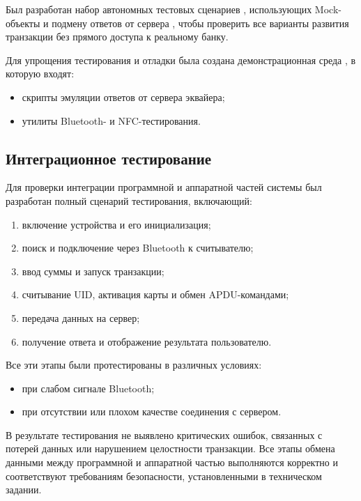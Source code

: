 Был разработан набор автономных тестовых сценариев , использующих Mock-объекты и подмену ответов от сервера , чтобы проверить все варианты развития транзакции без прямого доступа к реальному банку.


Для упрощения тестирования и отладки была создана демонстрационная среда , в которую входят:

\begin{itemize}
	\item скрипты эмуляции ответов от сервера эквайера;
	\item утилиты Bluetooth- и NFC-тестирования.
\end{itemize}

\subsection{Интеграционное тестирование}
\label{subsec:test_integr}
Для проверки интеграции программной и аппаратной частей системы был разработан полный сценарий тестирования, включающий:

\begin{enumerate}
	\item включение устройства и его инициализация;
	\item поиск и подключение через Bluetooth к считывателю;
	\item ввод суммы и запуск транзакции;
	\item считывание UID, активация карты и обмен APDU-командами;
	\item передача данных на сервер;
	\item получение ответа и отображение результата пользователю.
\end{enumerate}

Все эти этапы были протестированы в различных условиях:

\begin{itemize}
	\item при слабом сигнале Bluetooth;
	\item при отсутствии или плохом качестве соединения с сервером.
\end{itemize}

В результате тестирования не выявлено критических ошибок, связанных с потерей данных или нарушением целостности транзакции.
Все этапы обмена данными между программной и аппаратной частью выполняются корректно и соответствуют требованиям безопасности, установленными в техническом задании.






%
